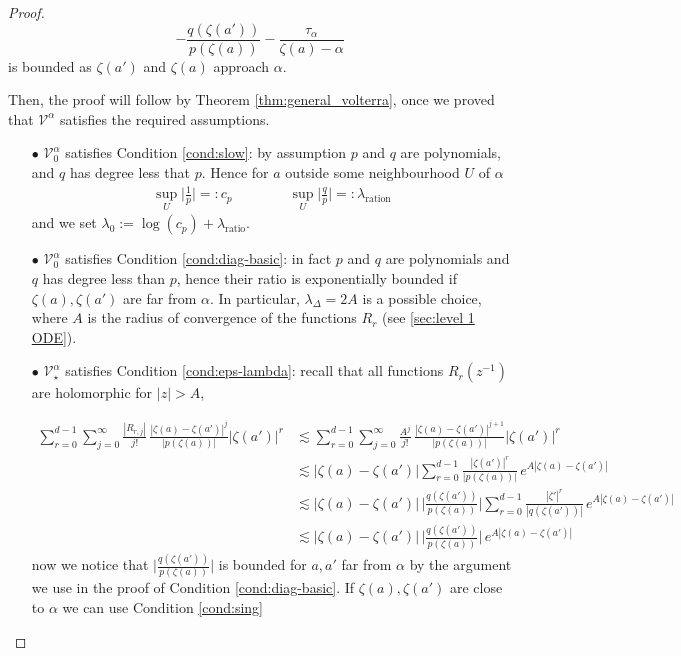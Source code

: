 \documentclass{article}
\theoremstyle{plain}
\newcommand{\volterra}{\mathcal{V}}
\newcommand{\hardpart}{\mathcal{V}_0}
\newcommand{\softpart}{\mathcal{V}_\star}
\begin{document}
\begin{proof}
\begin{equation*}
    -\frac{q(\zeta(a'))}{p(\zeta(a))}-\frac{\tau_\alpha}{\zeta(a)-\alpha}
\end{equation*}
is bounded as $\zeta(a')$ and $\zeta(a)$ approach $\alpha$. 

Then, the proof will follow by Theorem \ref{thm:general_volterra}, once we proved that $\volterra^\alpha$ satisfies the required assumptions.  

\begin{enumerate}
    \item[$\bullet$] $\hardpart^\alpha$ satisfies Condition \eqref{cond:slow}: by assumption $p$ and $q$ are polynomials, and $q$ has degree less that $p$. Hence for $a$ outside some neighbourhood $U$ of $\alpha$  
\begin{align*}
    \sup_U \Big\vert \frac{1}{p}\Big\vert =:c_p \qquad\qquad \sup_U \Big\vert\frac{q}{p}\Big\vert =:\lambda_\text{ration} 
\end{align*}
    and we set $\lambda_0:=\log(c_p)+\lambda_\text{ratio}$. 
    \item[$\bullet$] $\hardpart^\alpha$ satisfies Condition \eqref{cond:diag-basic}: in fact $p$ and $q$ are polynomials and $q$ has degree less than $p$, hence their ratio is exponentially bounded if $\zeta(a), \zeta(a')$ are far from $\alpha$. In particular, $\lambda_\Delta=2A$ is a possible choice, where $A$ is the radius of convergence of the functions $R_r$ (see \ref{sec:level 1 ODE}).    
    \item[$\bullet$]  $\softpart^\alpha$ satisfies Condition \eqref{cond:eps-lambda}: recall that all functions $R_r(z^{-1})$ are holomorphic for $|z|>A$, 

    \begin{align*}
        \sum_{r=0}^{d-1}\sum_{j=0}^\infty \frac{| R_{r,j}|}{j!} \, \frac{|\zeta(a)-\zeta(a')|^j}{|p(\zeta(a))|}|\zeta(a')|^r  &\lesssim \sum_{r=0}^{d-1}\sum_{j=0}^\infty \frac{A^j}{j!} \, \frac{|\zeta(a)-\zeta(a')|^{j+1}}{|p(\zeta(a))|}|\zeta(a')|^r \\
        & \lesssim |\zeta(a)-\zeta(a')| \sum_{r=0}^{d-1} \frac{|\zeta(a')|^r}{|p(\zeta(a))|}\,  e^{A |\zeta(a)-\zeta(a')|}\\
        &\lesssim |\zeta(a)-\zeta(a')| \, \Big\vert \frac{q(\zeta(a'))}{p(\zeta(a))}\Big\vert \sum_{r=0}^{d-1} \frac{|\zeta'|^r}{|q(\zeta(a'))|} \, e^{A |\zeta(a)-\zeta(a')|}\\
        &\lesssim |\zeta(a)-\zeta(a')| \, \Big\vert \frac{q(\zeta(a'))}{p(\zeta(a))}\Big\vert \,  e^{A |\zeta(a)-\zeta(a')|}
    \end{align*}
now we notice that $\Big\vert \frac{q(\zeta(a'))}{p(\zeta(a))}\Big\vert$ is bounded for $a,a'$ far from $\alpha$ by the argument we use in the proof of Condition \eqref{cond:diag-basic}. If $\zeta(a), \zeta(a')$ are close to $\alpha$ we can use Condition \eqref{cond:sing}


\end{enumerate}
\end{proof}
\end{document}
